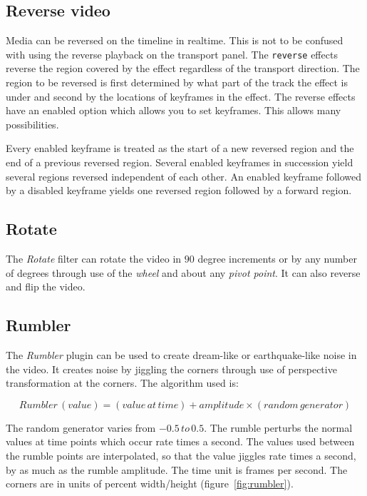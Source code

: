 \subsection{Reverse video}%
\label{sub:reverse_video}

Media can be reversed on the timeline in realtime. This is not to be confused with using the reverse playback on the transport panel. The \texttt{reverse} effects reverse the region covered by the effect regardless of the transport direction. The region to be reversed is first determined by what part of the track the effect is under and second by the locations of keyframes in the effect. The reverse effects have an enabled option which allows you to set keyframes. This allows many possibilities.

Every enabled keyframe is treated as the start of a new reversed region and the end of a previous reversed region. Several enabled keyframes in succession yield several regions reversed independent of each other. An enabled keyframe followed by a disabled keyframe yields one reversed region followed by a forward region.

\subsection{Rotate}%
\label{sub:rotate}

The \textit{Rotate} filter can rotate the video in $90$ degree increments or by any number of degrees through use of the \textit{wheel} and about any \textit{pivot point}. It can also reverse and flip the video.

\subsection{Rumbler}%
\label{sub:rumbler}

The \textit{Rumbler} plugin can be used to create dream-like or earthquake-like noise in the video. It creates noise by jiggling the corners through use of perspective transformation at the corners. The algorithm used is:

\[Rumbler\,(value) = (value\, at\, time) + amplitude \times (random\, generator)\]

The random generator varies from $-0.5\, to\, 0.5$. The rumble perturbs the normal values at time points which occur rate times a second. The values used between the rumble points are interpolated, so that the value jiggles rate times a second, by as much as the rumble amplitude. The time unit is frames per second. The corners are in units of percent width/height (figure~\ref{fig:rumbler}).

